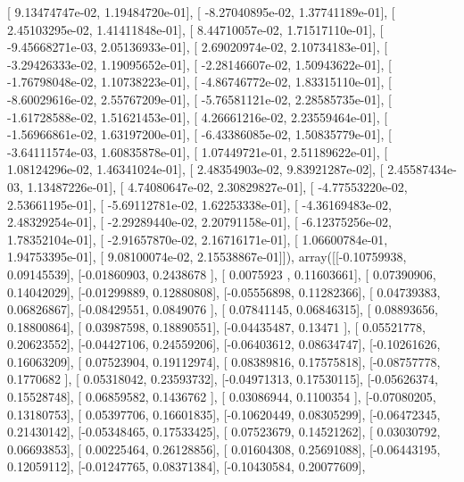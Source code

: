 \documentclass{article}
\begin{document}
       [  9.13474747e-02,   1.19484720e-01],
       [ -8.27040895e-02,   1.37741189e-01],
       [  2.45103295e-02,   1.41411848e-01],
       [  8.44710057e-02,   1.71517110e-01],
       [ -9.45668271e-03,   2.05136933e-01],
       [  2.69020974e-02,   2.10734183e-01],
       [ -3.29426333e-02,   1.19095652e-01],
       [ -2.28146607e-02,   1.50943622e-01],
       [ -1.76798048e-02,   1.10738223e-01],
       [ -4.86746772e-02,   1.83315110e-01],
       [ -8.60029616e-02,   2.55767209e-01],
       [ -5.76581121e-02,   2.28585735e-01],
       [ -1.61728588e-02,   1.51621453e-01],
       [  4.26661216e-02,   2.23559464e-01],
       [ -1.56966861e-02,   1.63197200e-01],
       [ -6.43386085e-02,   1.50835779e-01],
       [ -3.64111574e-03,   1.60835878e-01],
       [  1.07449721e-01,   2.51189622e-01],
       [  1.08124296e-02,   1.46341024e-01],
       [  2.48354903e-02,   9.83921287e-02],
       [  2.45587434e-03,   1.13487226e-01],
       [  4.74080647e-02,   2.30829827e-01],
       [ -4.77553220e-02,   2.53661195e-01],
       [ -5.69112781e-02,   1.62253338e-01],
       [ -4.36169483e-02,   2.48329254e-01],
       [ -2.29289440e-02,   2.20791158e-01],
       [ -6.12375256e-02,   1.78352104e-01],
       [ -2.91657870e-02,   2.16716171e-01],
       [  1.06600784e-01,   1.94753395e-01],
       [  9.08100074e-02,   2.15538867e-01]]), array([[-0.10759938,  0.09145539],
       [-0.01860903,  0.2438678 ],
       [ 0.0075923 ,  0.11603661],
       [ 0.07390906,  0.14042029],
       [-0.01299889,  0.12880808],
       [-0.05556898,  0.11282366],
       [ 0.04739383,  0.06826867],
       [-0.08429551,  0.0849076 ],
       [ 0.07841145,  0.06846315],
       [ 0.08893656,  0.18800864],
       [ 0.03987598,  0.18890551],
       [-0.04435487,  0.13471   ],
       [ 0.05521778,  0.20623552],
       [-0.04427106,  0.24559206],
       [-0.06403612,  0.08634747],
       [-0.10261626,  0.16063209],
       [ 0.07523904,  0.19112974],
       [ 0.08389816,  0.17575818],
       [-0.08757778,  0.1770682 ],
       [ 0.05318042,  0.23593732],
       [-0.04971313,  0.17530115],
       [-0.05626374,  0.15528748],
       [ 0.06859582,  0.1436762 ],
       [ 0.03086944,  0.1100354 ],
       [-0.07080205,  0.13180753],
       [ 0.05397706,  0.16601835],
       [-0.10620449,  0.08305299],
       [-0.06472345,  0.21430142],
       [-0.05348465,  0.17533425],
       [ 0.07523679,  0.14521262],
       [ 0.03030792,  0.06693853],
       [ 0.00225464,  0.26128856],
       [ 0.01604308,  0.25691088],
       [-0.06443195,  0.12059112],
       [-0.01247765,  0.08371384],
       [-0.10430584,  0.20077609],
\end{document}
